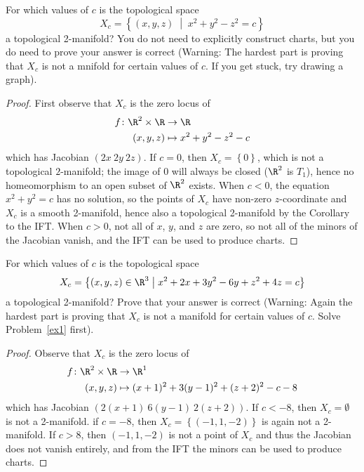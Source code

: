 \documentclass[10pt]{amsart}
\begin{document}
\begin{thm}\label{ex2}
  For which values of $c$ is the topological space
  $$X_c = \left\{(x,y,z) \;\middle\vert\; x^2 + y^2 - z^2 = c\right\}$$
  a topological 2-manifold?
  You do not need to explicitly construct charts, but you do need to prove your answer is correct (Warning: The hardest part is proving that $X_c$ is not a mnifold for certain values of $c$.  If you get stuck, try drawing a graph).

  \begin{proof}
	First observe that $X_c$ is the zero locus of
	\begin{align*}
		f \colon \R^2 \times \R &\rightarrow \R\\
		(x,y,z) &\mapsto x^2 + y^2 - z^2 - c
	\end{align*}
	which has Jacobian $(2x\ 2y\ 2z)$.
	If $c = 0$, then $X_c = \left\{0\right\}$, which is not a topological $2$-manifold; the image of $0$ will always be closed ($\R^2$ is $T_1$), hence no homeomorphism to an open subset of $\R^2$ exists.	
	When $c < 0$, the equation $x^2 + y^2 = c$ has no solution, so the points of $X_c$ have non-zero $z$-coordinate and $X_c$ is a smooth 2-manifold, hence also a topological 2-manifold by the Corollary to the IFT.
	When $c > 0$, not all of $x$, $y$, and $z$ are zero, so not all of the minors of the Jacobian vanish, and the IFT can be used to produce charts.
  \end{proof}
\end{thm}

\begin{thm}\label{ex3}
  For which values of $c$ is the topological space
  $$X_c = \left\{(x,y,z) \in \R^3 \;\middle\vert\; x^2 + 2x + 3y^2 - 6y + z^2 + 4z = c\right\}$$
  a topological 2-manifold?
  Prove that your answer is correct (Warning: Again the hardest part is proving that $X_c$ is not a manifold for certain values of $c$.
  Solve Problem~\ref{ex1} first).

  \begin{proof}
	Observe that $X_c$ is the zero locus of
	\begin{align*}
		f \colon \R^2 \times \R &\rightarrow \R^1\\
		(x,y,z) &\mapsto (x + 1)^2 + 3(y - 1)^2 + (z +2)^2 - c - 8
	\end{align*}
	which has Jacobian $(2(x +1)\ 6(y - 1)\ 2(z + 2))$.
	If $c < -8$, then $X_c = \emptyset$ is not a 2-manifold.
	if $c = -8$, then $X_c = \left\{(-1, 1, -2)\right\}$ is again not a 2-manifold.
	If $c > 8$, then $(-1,1,-2)$ is not a point of $X_c$ and thus the Jacobian does not vanish entirely, and from the IFT  the minors can be used to produce charts.
  \end{proof}
\end{thm}
\end{document}
